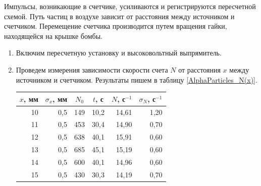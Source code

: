 	Импульсы, возникающие в счетчике, усиливаются и регистрируются пересчетной схемой. Путь частиц в воздухе зависит от расстояния между источником и счетчиком. Перемещение счетчика производится путем вращения гайки, находящейся на крышке бомбы.

	
	\begin{enumerate}
		\item Включим пересчетную установку и высоковольтный выпрямитель. 
		
		\item Проведем измерения зависимости скорости счета $N$ от расстояния $x$ между источником и счетчиком. Результаты пишем в таблицу \ref{AlphaParticles_N(x)}.

		\begin{table}[h!]
			\centering
				\begin{tabular}{|r|r|r|r|r|r|}
					\hline
					\multicolumn{1}{|c|}{$x$, мм} & \multicolumn{1}{c|}{$\sigma_x$, мм} & \multicolumn{1}{c|}{$N_0$} & \multicolumn{1}{c|}{$t$, с} & \multicolumn{1}{c|}{$N$, с$^{-1}$} & \multicolumn{1}{c|}{$\sigma_{N}$, с$^{-1}$} \\ \hline
					10                            & 0,5                                 & 149                        & 10,2                        & 14,61                              & 1,20                                         \\ \hline
					11                            & 0,5                                 & 453                        & 30,4                        & 14,90                              & 0,70                                         \\ \hline
					12                            & 0,5                                 & 638                        & 40,1                        & 15,91                              & 0,60                                         \\ \hline
					13                            & 0,5                                 & 685                        & 45,1                        & 15,19                              & 0,60                                         \\ \hline
					14                            & 0,5                                 & 600                        & 40,1                        & 14,96                              & 0,60                                         \\ \hline
					15                            & 0,5                                 & 430                        & 30,3                        & 14,19                              & 0,70                                         \\ \hline

\end{tabular}
\end{table}
\end{enumerate}
